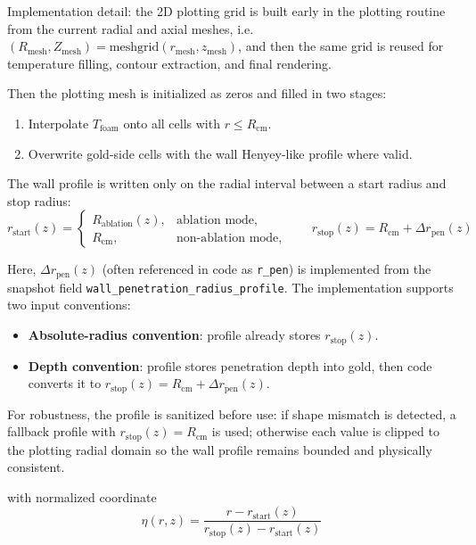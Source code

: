 \documentclass[12pt,a4paper]{article}
\begin{document}
Implementation detail: the 2D plotting grid is built early in the plotting routine from
the current radial and axial meshes, i.e. $(R_{\mathrm{mesh}}, Z_{\mathrm{mesh}})=\mathrm{meshgrid}(r_{\mathrm{mesh}}, z_{\mathrm{mesh}})$,
and then the same grid is reused for temperature filling, contour extraction, and final rendering.

Then the plotting mesh is initialized as zeros and filled in two stages:
\begin{enumerate}
    \item Interpolate $T_{\mathrm{foam}}$ onto all cells with $r \leq R_{\mathrm{cm}}$.
    \item Overwrite gold-side cells with the wall Henyey-like profile where valid.
\end{enumerate}

The wall profile is written only on the radial interval between a start radius and stop radius:
\begin{equation}
r_{\mathrm{start}}(z)=
\begin{cases}
R_{\mathrm{ablation}}(z), & \text{ablation mode}, \\
R_{\mathrm{cm}}, & \text{non-ablation mode},
\end{cases}
\qquad
r_{\mathrm{stop}}(z)=R_{\mathrm{cm}}+\Delta r_{\mathrm{pen}}(z)
\end{equation}

Here, $\Delta r_{\mathrm{pen}}(z)$ (often referenced in code as \texttt{r\_pen}) is implemented from the
snapshot field \texttt{wall\_penetration\_radius\_profile}. The implementation supports two input conventions:
\begin{itemize}
    \item \textbf{Absolute-radius convention}: profile already stores $r_{\mathrm{stop}}(z)$.
    \item \textbf{Depth convention}: profile stores penetration depth into gold, then code converts it to
    $r_{\mathrm{stop}}(z)=R_{\mathrm{cm}}+\Delta r_{\mathrm{pen}}(z)$.
\end{itemize}

For robustness, the profile is sanitized before use: if shape mismatch is detected, a fallback profile with
$r_{\mathrm{stop}}(z)=R_{\mathrm{cm}}$ is used; otherwise each value is clipped to the plotting radial domain so
the wall profile remains bounded and physically consistent.

with normalized coordinate
\begin{equation}
\eta(r,z)=\frac{r-r_{\mathrm{start}}(z)}{r_{\mathrm{stop}}(z)-r_{\mathrm{start}}(z)}
\end{equation}
\end{document}
